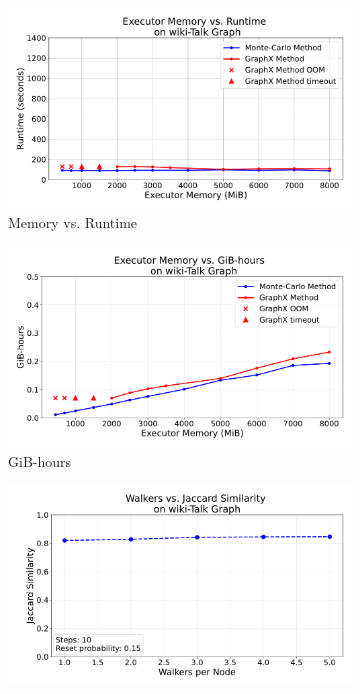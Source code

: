 \begin{figure}[H]
    \centering
    \begin{subfigure}[t]{0.5\linewidth}
        \centering
        \includegraphics[width=\linewidth]{images/plots/wiki-Talk/memory_vs_runtime_wiki_talk.pdf}
        \caption{Memory vs. Runtime}
        \label{fig:wikirun}
    \end{subfigure}\hfill
    \begin{subfigure}[t]{0.5\linewidth}
        \centering
        \includegraphics[width=\linewidth]{images/plots/wiki-Talk/gbhrs_nodes_wiki_talk.pdf}
        \caption{GiB-hours}
        \label{fig:wikigibhrs}
    \end{subfigure}
    \begin{subfigure}[t]{0.5\linewidth}
        \centering
        \includegraphics[width=\linewidth]{images/plots/wiki-Talk/accuracy_plots_wiki_talk.pdf}

\end{subfigure}
\end{figure}
